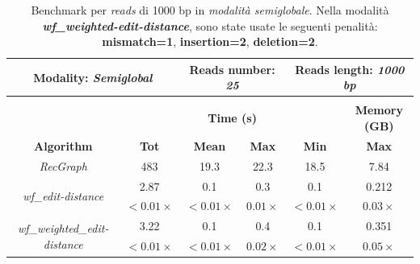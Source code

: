     \begin{table}[h]
        \centering
        \begin{tabular}{|c|c|c|c|c|c|}
            \hline
                \multicolumn{2}{|c|}{\textbf{Modality:} \emph{Semiglobal}} & \multicolumn{2}{|c|}{\textbf{Reads number: } \emph{25}} & \multicolumn{2}{|c|}{\textbf{Reads length:} \emph{1000 bp}} \\
            \hline
                \multicolumn{6}{|c|}{} \\
            \hline
                & \multicolumn{4}{|c|}{\textbf{Time (s)}} & \textbf{Memory (GB)} \\
            \hline
                \textbf{Algorithm} & \textbf{Tot} & \textbf{Mean} & \textbf{Max} & \textbf{Min} & \textbf{Max} \\
            \hline
                \emph{RecGraph} & 483 & 19.3 & 22.3 & 18.5 & 7.84 \\
            \hline
                \multirow{2}{*}{\emph{wf\_edit-distance}} & 2.87 & 0.1 & 0.3 & 0.1 & 0.212 \\
                & $<0.01 \times$ & $<0.01 \times$ & $0.01 \times$ & $<0.01 \times$ & $0.03 \times$ \\
            \hline
                \multirow{2}{*}{\emph{wf\_weighted\_edit-distance}} & 3.22 & 0.1 & 0.4 & 0.1 & 0.351 \\
                & $<0.01 \times$ & $<0.01 \times$ & $0.02 \times$ & $<0.01 \times$ & $0.05 \times$ \\
            \hline
        \end{tabular}
        \caption{Benchmark per \emph{reads} di 1000 bp in \emph{modalità semiglobale}. Nella modalità \textbf{\textit{wf\_weighted-edit-distance}}, sono state usate le seguenti penalità: \textbf{mismatch=1}, \textbf{insertion=2}, \textbf{deletion=2}.}
        \label{tab:benchmark_semiglobal_1k}
    \end{table}
    \vspace{20pt}
    
